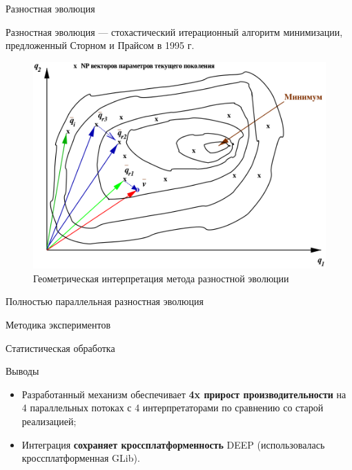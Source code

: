 \documentclass{beamer}
\begin{document}
\begin{frame}{Разностная эволюция}
    \begin{block}{Разностная эволюция}
        --- стохастический итерационный алгоритм минимизации,
        предложенный Сторном и Прайсом в 1995 г.
    \end{block}
    \begin{figure}[!h]
        \centering
        \includegraphics[scale=0.2]{DE}
        \caption{Геометрическая интерпретация метода разностной эволюции}
    \end{figure}
\end{frame}

\begin{frame}{Полностью параллельная разностная эволюция}
\end{frame}

\begin{frame}{Методика экспериментов}
\end{frame}

\begin{frame}{Статистическая обработка}
\end{frame}

\begin{frame}{Выводы}
\begin{itemize}
    \item Разработанный механизм обеспечивает
        \textbf{4x прирост производительности}
        на 4 параллельных потоках с 4 интерпретаторами по
        сравнению со старой реализацией;
    \item Интеграция \textbf{сохраняет кроссплатформенность} DEEP
        (использовалась кроссплатформенная GLib).
\end{itemize}
\end{frame}
\end{document}
